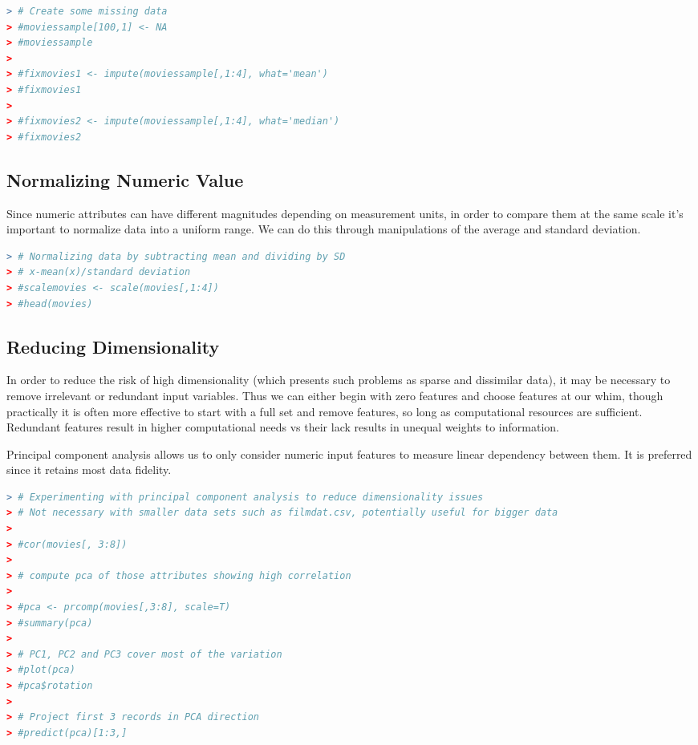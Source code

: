 \documentclass{article}
\begin{document}
\begin{spacing}{1.1}
\begin{lstlisting}[language=R]
> # Create some missing data
> #moviessample[100,1] <- NA
> #moviessample
> 
> #fixmovies1 <- impute(moviessample[,1:4], what='mean')
> #fixmovies1
> 
> #fixmovies2 <- impute(moviessample[,1:4], what='median')
> #fixmovies2
\end{lstlisting}

\subsection{Normalizing Numeric Value}

Since numeric attributes can have different magnitudes depending on measurement units, in order to compare them at the same scale it's important to normalize data into a uniform range.  We can do this through manipulations of the average and standard deviation.  

\vspace{3mm}

\begin{lstlisting}[language=R]
> # Normalizing data by subtracting mean and dividing by SD
> # x-mean(x)/standard deviation
> #scalemovies <- scale(movies[,1:4])
> #head(movies)
\end{lstlisting}

\subsection{Reducing Dimensionality}

In order to reduce the risk of high dimensionality (which presents such problems as sparse and dissimilar data), it may be necessary to remove irrelevant or redundant input variables.  Thus we can either begin with zero features and choose features at our whim, though practically it is often more effective to start with a full set and remove features, so long as computational resources are sufficient.  Redundant features result in higher computational needs vs their lack results in unequal weights to information.  

\vspace{3mm}

Principal component analysis allows us to only consider numeric input features to measure linear dependency between them.  It is preferred since it retains most data fidelity.  

\vspace{3mm}

\begin{lstlisting}[language=R]
> # Experimenting with principal component analysis to reduce dimensionality issues
> # Not necessary with smaller data sets such as filmdat.csv, potentially useful for bigger data
> 
> #cor(movies[, 3:8])
> 
> # compute pca of those attributes showing high correlation
> 
> #pca <- prcomp(movies[,3:8], scale=T)
> #summary(pca)
> 
> # PC1, PC2 and PC3 cover most of the variation
> #plot(pca)
> #pca$rotation
> 
> # Project first 3 records in PCA direction
> #predict(pca)[1:3,]
\end{lstlisting}



\end{spacing}
\end{document}
